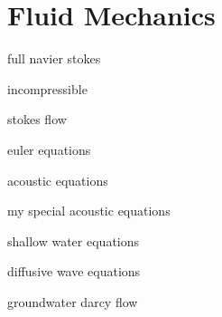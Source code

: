 \chapter{Fluid Mechanics}
\label{chapter:Fluid-Mechanics}


full navier stokes

incompressible

stokes flow

euler equations

acoustic equations

my special acoustic equations

shallow water equations

diffusive wave equations

groundwater darcy flow